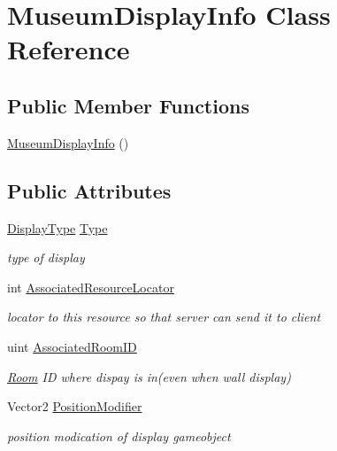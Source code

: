 \hypertarget{class_museum_display_info}{}\section{Museum\+Display\+Info Class Reference}
\label{class_museum_display_info}
\subsection*{Public Member Functions}
\begin{DoxyCompactItemize}
\item 
\mbox{\hyperlink{class_museum_display_info_a755099749d31cd5c6f06a2d0210832b9}{Museum\+Display\+Info}} ()
\end{DoxyCompactItemize}
\subsection*{Public Attributes}
\begin{DoxyCompactItemize}
\item 
\mbox{\hyperlink{_museum_8cs_a18c0cbeece6bcb1c64d7463ce253ff50}{Display\+Type}} \mbox{\hyperlink{class_museum_display_info_af1d44e6a63020a6ba8e2f5dff181ecbf}{Type}}
\begin{DoxyCompactList}\small\item\em type of display \end{DoxyCompactList}\item 
int \mbox{\hyperlink{class_museum_display_info_a25d91f72173cc5c600c2a3e1e381828f}{Associated\+Resource\+Locator}}
\begin{DoxyCompactList}\small\item\em locator to this resource so that server can send it to client \end{DoxyCompactList}\item 
uint \mbox{\hyperlink{class_museum_display_info_af044b6e18f3d6f17832ee2bd10c0cc62}{Associated\+Room\+ID}}
\begin{DoxyCompactList}\small\item\em \mbox{\hyperlink{class_room}{Room}} ID where dispay is in(even when wall display) \end{DoxyCompactList}\item 
Vector2 \mbox{\hyperlink{class_museum_display_info_ab51b43a4fad77be4256ee61a957bfbfb}{Position\+Modifier}}
\begin{DoxyCompactList}\small\item\em position modication of display gameobject \end{DoxyCompactList}\end{DoxyCompactItemize}


